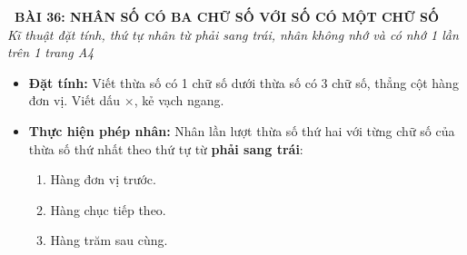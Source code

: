 \documentclass[11pt,a4paper]{article}
\begin{document}
\begin{tcolorbox}[
  enhanced,
  colback=white,
  colframe=primary,
  arc=3mm,
  boxrule=1.2pt,
  left=4mm, right=4mm, top=2.5mm, bottom=2.5mm,
  drop shadow=black!10!white
]
  \centering
  {\Large\bfseries\color{primary}\faBookmark\ BÀI 36: NHÂN SỐ CÓ BA CHỮ SỐ VỚI SỐ CÓ MỘT CHỮ SỐ}\\[1.5mm]
  {\small\itshape\color{black!75}Kĩ thuật đặt tính, thứ tự nhân từ phải sang trái, nhân không nhớ và có nhớ 1 lần trên 1 trang A4}
\end{tcolorbox}

\vspace{-2mm}


\noindent
\begin{minipage}[t]{0.49\textwidth}\vspace{0pt}
\begin{tcolorbox}[
  enhanced,
  colback=blue!4!white,
  colframe=blue!75!black,
  arc=2mm, boxrule=0.8pt,
  left=2mm, right=2mm, top=1.8mm, bottom=1.8mm,
  title={\footnotesize\bfseries\color{white}\faTimes\ 1. Quy trình Đặt tính rồi tính}
]
{\footnotesize
\begin{itemize}\setlength{\itemsep}{1.5pt}\setlength{\leftskip}{-2.5mm}
  \item \textbf{Đặt tính:} Viết thừa số có 1 chữ số dưới thừa số có 3 chữ số, thẳng cột hàng đơn vị. Viết dấu $\times$, kẻ vạch ngang.
  \item \textbf{Thực hiện phép nhân:} Nhân lần lượt thừa số thứ hai với từng chữ số của thừa số thứ nhất theo thứ tự từ \textbf{phải sang trái}:
  \begin{enumerate}\setlength{\itemsep}{0.5pt}\setlength{\leftskip}{-2.5mm}
    \item Hàng đơn vị trước.
    \item Hàng chục tiếp theo.
    \item Hàng trăm sau cùng.
  \end{enumerate}
\end{itemize}
}
\end{tcolorbox}
\end{minipage}
\hfill
\end{document}
